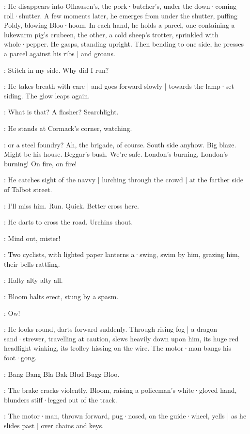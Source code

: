 :
He disappears into Olhausen's,
the pork·butcher's,
under the down·coming roll·shutter.
A few moments later,
he emerges from under the shutter,
puffing Poldy,
blowing Bloo·hoom.
In each hand,
he holds a parcel,
one containing a lukewarm pig's crubeen,
the other,
a cold sheep's trotter,
sprinkled with whole·pepper.
He gasps,
standing upright.%
Then bending to one side,
he presses a parcel against his ribs |
and groans.

\Bloom:
Stitch in my side.
Why did I run?

:
He takes breath with care |
and goes forward slowly |
towards the lamp·set siding.
The glow leaps again.

\Bloom:
What is that?
A flasher?
Searchlight.

:
He stands at Cormack's corner,
watching.

\Bloom:
or a steel foundry?
Ah,
the brigade,
of course.
South side anyhow.
Big blaze.
Might be his house.
Beggar's bush.
We're safe.
London's burning,
London's burning!
On fire,
on fire!

:
He catches sight of the navvy |
lurching through the crowd |
at the farther side of Talbot street.

\Bloom:
I'll miss him.
Run.
Quick.
Better cross here.

:
He darts to cross the road.
Urchins shout.

\Urchins:
Mind out,
mister!

:
Two cyclists,
with lighted paper lanterns a·swing,
swim by him,
grazing him,
their bells rattling.

\Bells:
Halty-alty-alty-all.

:
Bloom halts erect,
stung by a spasm.

\Bloom:
Ow!

:
He looks round,
darts forward suddenly.
Through rising fog |
a dragon sand·strewer,
travelling at caution,
slews heavily down upon him,
its huge red headlight winking,
its trolley hissing on the wire.
The motor·man bangs his foot·gong.

\Gong:
Bang Bang Bla Bak Blud Bugg Bloo.

:
The brake cracks violently.
Bloom,
raising a policeman's white·gloved hand,
blunders stiff·legged out of the track.

:
The motor·man,
thrown forward,
pug·nosed,
on the guide·wheel,
yells |
as he slides past |
over chains and keys.


